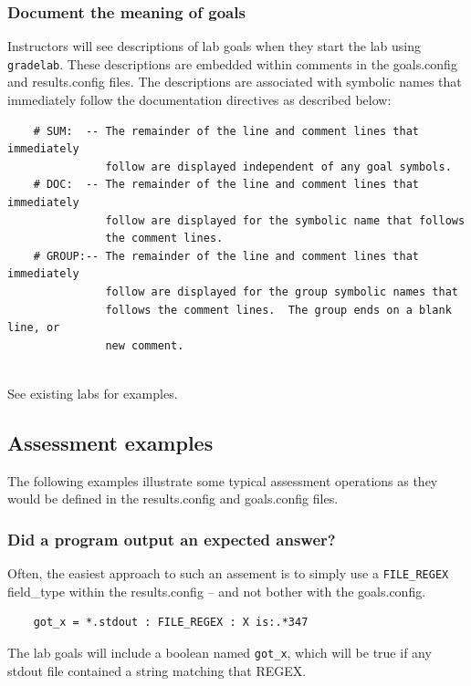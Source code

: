 \documentclass[12pt]{article}
\begin{document}
\subsubsection{Document the meaning of goals}
\label{document goals}
Instructors will see descriptions of lab goals when they start the lab using {\tt gradelab}.
These descriptions are embedded within comments in the goals.config and results.config files.
The descriptions are associated with symbolic names that immediately follow the documentation
directives as described below:
\begin{verbatim}
    # SUM:  -- The remainder of the line and comment lines that immediately
               follow are displayed independent of any goal symbols.
    # DOC:  -- The remainder of the line and comment lines that immediately 
               follow are displayed for the symbolic name that follows
               the comment lines.
    # GROUP:-- The remainder of the line and comment lines that immediately 
               follow are displayed for the group symbolic names that 
               follows the comment lines.  The group ends on a blank line, or 
               new comment.
   
\end{verbatim} 
\noindent See existing labs for examples.


\subsection{Assessment examples}
\label{examples}
The following examples illustrate some typical assessment operations as they would
be defined in the results.config and goals.config files.

\subsubsection{Did a program output an expected answer?}
Often, the easiest approach to such an assement is to simply use a {\tt FILE\_REGEX} field\_type
within the results.config -- and not bother with the goals.config.
\begin{verbatim}
    got_x = *.stdout : FILE_REGEX : X is:.*347
\end{verbatim}
The lab goals will include a boolean named {\tt got\_x}, which will be true if any stdout file
contained a string matching that REGEX.
\end{document}
